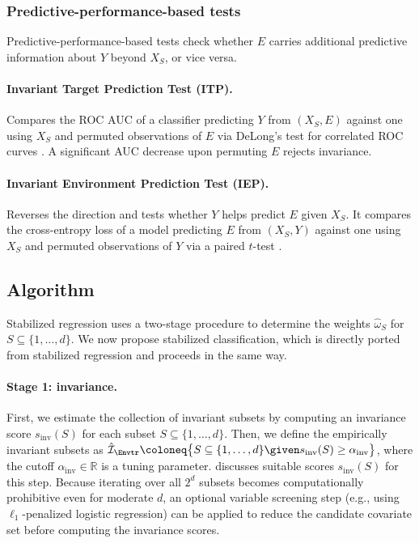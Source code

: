\subsubsection{Predictive-performance-based tests}

Predictive-performance-based tests check whether $E$ carries additional predictive information about $Y$ beyond $X_S$, or vice versa.

\paragraph{Invariant Target Prediction Test (ITP).}
Compares the ROC AUC of a classifier predicting $Y$ from $(X_S, E)$ against one using $X_S$ and permuted observations of $E$ via DeLong's test \citep{delongComparingAreasTwo1988} for correlated ROC curves \citep{heinze-demlInvariantCausalPrediction2018, salas-porrasIdentifyingCausesPyrocumulonimbus2022}. A significant AUC decrease upon permuting $E$ rejects invariance.

\paragraph{Invariant Environment Prediction Test (IEP).}
Reverses the direction and tests whether $Y$ helps predict $E$ given $X_S$. It compares the cross-entropy loss of a model predicting $E$ from $(X_S, Y)$ against one using $X_S$ and permuted observations of $Y$ via a paired $t$-test \citep[adapted from][]{heinze-demlInvariantCausalPrediction2018}.


\subsection{Algorithm} \label{app:SC_alg}

Stabilized regression \citep{pfisterStabilizingVariableSelection2021} uses a two-stage procedure to determine the weights $\hat{\omega}_S$ for $S \subseteq \{1, \ldots, d\}$. 
We now propose
stabilized classification, which is directly ported from stabilized regression and proceeds in the same way.

\paragraph{Stage 1: invariance.} First, we estimate the collection of invariant subsets by computing an invariance score $s_\mathrm{inv}(S)$ for each subset $S \subseteq \{1, \ldots, d\}$. Then, we define the empirically invariant subsets as $\hat{\mathcal{I}}_{\Envtr} \coloneq \big\{S \subseteq \{1, \ldots, d\} \given s_\mathrm{inv}(S) \geq \alpha_\mathrm{inv} \big\}$, where the cutoff $\alpha_\mathrm{inv} \in \mathbb{R}$ is a tuning parameter.  discusses suitable scores $s_\mathrm{inv}(S)$ for this step. Because iterating over all $2^d$ subsets becomes computationally prohibitive even for moderate $d$, an optional variable screening step (e.g., using $\ell_1$-penalized logistic regression) can be applied to reduce the candidate covariate set before computing the invariance scores.


